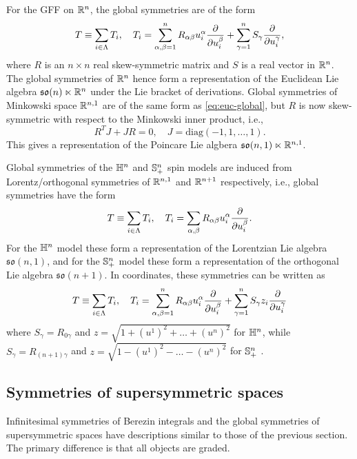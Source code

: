 \documentclass[11pt,a4paper]{article}
\begin{document}
For the GFF on $\mathbb{R}^{n}$, the global symmetries are of the form
\begin{equation}\label{eq:euc-global}
T \equiv \sum_{i\in \Lambda}T_i,\quad T_i = \sum_{\alpha,\beta = 1}^n R_{\alpha\beta} u^\alpha_i \frac{\partial }{\partial u^\beta_i} + \sum_{\gamma = 1}^{n}S_{\gamma}\frac{\partial }{\partial u^\gamma_i},  
\end{equation}
where $R$ is an $n\times n$ real skew-symmetric matrix and $S$ is a
real vector in $\mathbb{R}^{n}$.  The global symmetries of $\mathbb{R}^{n}$ hence form
a representation of the Euclidean Lie algebra
$\mathfrak{so}(n) \ltimes \mathbb{R}^{n}$ under the Lie bracket of
derivations.  Global symmetries of Minkowski space $\mathbb{R}^{n,1}$ are of
the same form as \eqref{eq:euc-global}, but $R$ is now skew-symmetric
with respect to the Minkowski inner product, i.e.,
\begin{equation}
  R^{T}J + JR = 0, \quad J = \mathrm{diag}(-1,1,\dots,1).
\end{equation}
This gives a representation of the Poincare Lie algbera
$\mathfrak{so}(n,1) \ltimes\mathbb{R}^{n,1}$.

Global symmetries of the $\mathbb{H}^{n}$ and
${\mathbb S}^{n}_+$ spin models are induced from Lorentz/orthogonal
symmetries of $\mathbb{R}^{n,1}$ and
$\mathbb{R}^{n+1}$ respectively, i.e., global symmetries have
the form
\begin{equation}
T \equiv \sum_{i\in \Lambda}T_i,\quad   T_i = \sum_{\alpha,\beta} R_{\alpha\beta} u^\alpha_i \frac{\partial }{\partial u^\beta_i}. 
\end{equation}
For the
$\mathbb{H}^n$ model these form a representation of the Lorentzian Lie
algebra $\mathfrak{so}(n,1)$, and for the
${\mathbb S}^{n}_+$ model these form a representation of the orthogonal Lie
algebra
$\mathfrak{so}(n+1)$. In coordinates, these
symmetries can be written as
\begin{equation}
T \equiv \sum_{i\in \Lambda}T_i,\quad T_i = \sum_{\alpha,\beta = 1}^n R_{\alpha\beta} u^\alpha_i \frac{\partial }{\partial u^\beta_i} + \sum_{\gamma=1}^nS_{\gamma}z_i\frac{\partial }{\partial u^\gamma_i}
\end{equation}
where $S_{\gamma} = R_{0\gamma}$ and $z = \sqrt{1 + (u^1)^2 + \dots +
  (u^n)^2}$ for $\mathbb{H}^n$, while
$S_{\gamma} = R_{(n+1)\gamma}$ and  $z = \sqrt{1 - (u^1)^2 - \dots  - (u^n)^2}$ for ${\mathbb S}^n_+$ .

\subsection{Symmetries of supersymmetric spaces}
\label{sec:susy-symmetries}
Infinitesimal symmetries of Berezin integrals and the global
symmetries of supersymmetric spaces have descriptions similar to those
of the previous section.  The primary difference is that all
objects are graded.
\end{document}
